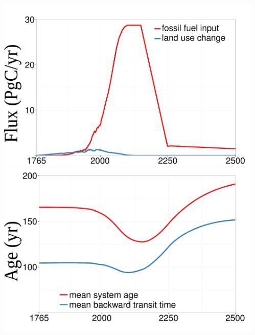 \begin{columns}
	\setlength{\lc}{0.39\textwidth}
	\begin{column}{\lc}
		\begin{minipage}[T]{\textwidth}
			\includegraphics[width=0.9\lc]{images/content/ext_inp.pdf}
			\\
			\includegraphics[width=0.9\lc]{images/content/means.pdf}
		\end{minipage}
	\end{column}
	\setlength{\rc}{\the\dimexpr (\textwidth-\lc) \relax }
	\begin{column}{\rc}
		\begin{minipage}[T]{\textwidth}

\end{minipage}
\end{column}
\end{columns}
